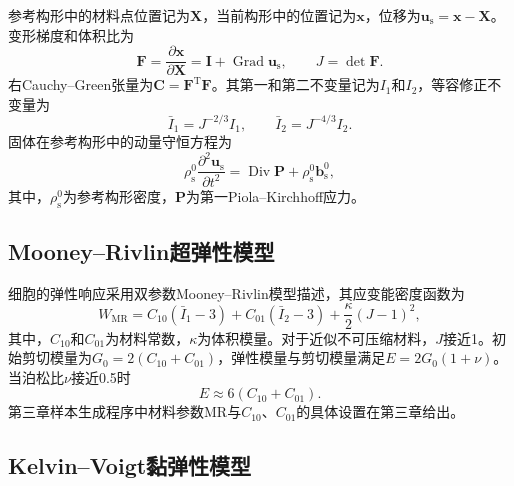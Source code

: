 参考构形中的材料点位置记为$\boldsymbol{X}$，当前构形中的位置记为$\boldsymbol{x}$，位移为$\boldsymbol{u}_{\mathrm s}=\boldsymbol{x}-\boldsymbol{X}$。变形梯度和体积比为
\begin{equation}
\boldsymbol{F}
=
\frac{\partial\boldsymbol{x}}{\partial\boldsymbol{X}}
=
\boldsymbol{I}
+
\operatorname{Grad}\boldsymbol{u}_{\mathrm s},
\qquad
J=\det\boldsymbol{F}.
\label{eq:ch2_deformation_gradient}
\end{equation}
右Cauchy--Green张量为$\boldsymbol{C}=\boldsymbol{F}^{\mathrm T}\boldsymbol{F}$。其第一和第二不变量记为$I_1$和$I_2$，等容修正不变量为
\begin{equation}
\bar I_1=J^{-2/3}I_1,
\qquad
\bar I_2=J^{-4/3}I_2.
\label{eq:ch2_modified_invariants}
\end{equation}
固体在参考构形中的动量守恒方程为
\begin{equation}
\rho_{\mathrm s}^0
\frac{\partial^2\boldsymbol{u}_{\mathrm s}}{\partial t^2}
=
\operatorname{Div}\boldsymbol{P}
+
\rho_{\mathrm s}^0\boldsymbol{b}_{\mathrm s}^0,
\label{eq:ch2_solid_momentum_reference}
\end{equation}
其中，$\rho_{\mathrm s}^0$为参考构形密度，$\boldsymbol{P}$为第一Piola--Kirchhoff应力\cite{holzapfel2000nonlinear,ogden1997nonlinear,bonet2008nonlinear}。

\subsection{Mooney--Rivlin超弹性模型}

细胞的弹性响应采用双参数Mooney--Rivlin模型描述，其应变能密度函数为
\begin{equation}
W_{\mathrm{MR}}
=
C_{10}\left(\bar I_1-3\right)
+
C_{01}\left(\bar I_2-3\right)
+
\frac{\kappa}{2}\left(J-1\right)^2,
\label{eq:ch2_mooney_rivlin}
\end{equation}
其中，$C_{10}$和$C_{01}$为材料常数，$\kappa$为体积模量。对于近似不可压缩材料，$J$接近1。初始剪切模量为$G_0=2(C_{10}+C_{01})$，弹性模量与剪切模量满足$E=2G_0(1+\nu)$。当泊松比$\nu$接近0.5时
\begin{equation}
E
\approx
6\left(C_{10}+C_{01}\right).
\label{eq:ch2_mr_modulus_relation}
\end{equation}
第三章样本生成程序中材料参数$\mathrm{MR}$与$C_{10}$、$C_{01}$的具体设置在第三章给出\cite{mooney1940large,rivlin1948large}。

\subsection{Kelvin--Voigt黏弹性模型}

